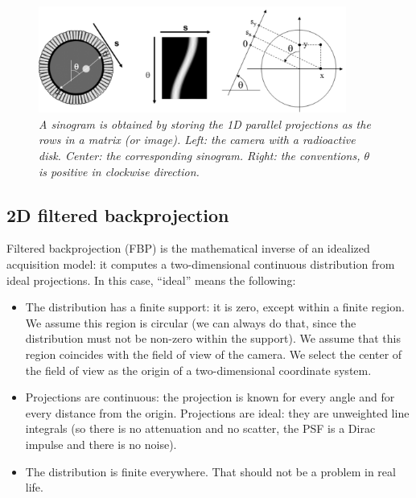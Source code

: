 \begin{figure}[tb]
\centering
\includegraphics[width=0.9\textwidth]{figs/fig_sinogram.pdf}
\caption{\label{fig:sinogram} \emph{A sinogram is obtained by storing the 1D
parallel projections as the rows in a matrix (or image). Left: the camera with
a radioactive disk. Center: the corresponding sinogram. Right: the
conventions, $\theta$ is positive in clockwise direction.}}
\end{figure}

\subsection{2D filtered backprojection}
Filtered backprojection (FBP) is the mathematical inverse of an idealized
acquisition model: it computes a two-dimensional continuous distribution from
ideal projections. In this case, ``ideal'' means the following:
\begin{itemize}
\item
The distribution has a finite support: it is zero, except within a finite
region.  We assume this region is circular (we can always do that, since the
distribution must not be non-zero within the support). We assume that this
region coincides with the field of view of the camera. We select the center of
the field of view as the origin of a two-dimensional coordinate system.

\item
Projections are continuous: the projection is known for every angle and for
every distance from the origin. Projections are ideal: they are unweighted
line integrals (so there is no attenuation and no scatter, the PSF is a Dirac
impulse and there is no noise).

\item
The distribution is finite everywhere. That should not be a problem in real
life.

\end{itemize}

